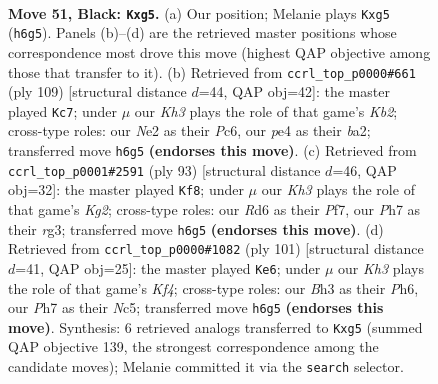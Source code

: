 \documentclass[11pt]{article}
\begin{document}
\clearpage

\begin{figure}[p]\centering
\begin{subfigure}{0.46\textwidth}\centering
\resizebox{\linewidth}{!}{%
\newchessgame
\chessboard[
  setfen={8/7p/3r1p1k/6R1/1p2P1P1/4K2b/4n1r1/8 b - - 6 51},
  showmover=false,
  pgfstyle=straightmove, color=movearrow, markmove={h6-g5}
]}
\caption{}
\end{subfigure}\hfill
\begin{subfigure}{0.46\textwidth}\centering
\resizebox{\linewidth}{!}{%
\newchessgame
\chessboard[
  setfen={8/1k6/2p2r2/4b2P/1R3P2/p4K2/B7/8 b - - 5 55},
  showmover=false,
  pgfstyle=straightmove, color=movearrow, markmove={b7-c7}
]}
\caption{}
\end{subfigure}
\\[4pt]
\begin{subfigure}{0.46\textwidth}\centering
\resizebox{\linewidth}{!}{%
\newchessgame
\chessboard[
  setfen={8/5pk1/8/p4K2/2R2P2/6R1/3b1r1p/8 b - - 1 47},
  showmover=false,
  pgfstyle=straightmove, color=movearrow, markmove={g7-f8}
]}
\caption{}
\end{subfigure}\hfill
\begin{subfigure}{0.46\textwidth}\centering
\resizebox{\linewidth}{!}{%
\newchessgame
\chessboard[
  setfen={8/8/7p/2n1pkrp/R7/5RP1/6K1/8 b - - 5 51},
  showmover=false,
  pgfstyle=straightmove, color=movearrow, markmove={f5-e6}
]}
\caption{}
\end{subfigure}
\caption{\textbf{Move 51, Black: \texttt{Kxg5}.} (a) Our position; Melanie plays \texttt{Kxg5} (\texttt{h6g5}). Panels (b)--(d) are the retrieved master positions whose correspondence most drove this move (highest QAP objective among those that transfer to it). (b) Retrieved from \texttt{ccrl\_top\_p0000\#661} (ply 109) [structural distance $d$=44, QAP obj=42]: the master played \texttt{Kc7}; under $\mu$ our \emph{Kh3} plays the role of that game's \emph{Kb2}; cross-type roles: our \emph{N}e2 as their \emph{P}c6, our \emph{p}e4 as their \emph{b}a2; transferred move \texttt{h6g5} \textbf{(endorses this move)}. (c) Retrieved from \texttt{ccrl\_top\_p0001\#2591} (ply 93) [structural distance $d$=46, QAP obj=32]: the master played \texttt{Kf8}; under $\mu$ our \emph{Kh3} plays the role of that game's \emph{Kg2}; cross-type roles: our \emph{R}d6 as their \emph{P}f7, our \emph{P}h7 as their \emph{r}g3; transferred move \texttt{h6g5} \textbf{(endorses this move)}. (d) Retrieved from \texttt{ccrl\_top\_p0000\#1082} (ply 101) [structural distance $d$=41, QAP obj=25]: the master played \texttt{Ke6}; under $\mu$ our \emph{Kh3} plays the role of that game's \emph{Kf4}; cross-type roles: our \emph{B}h3 as their \emph{P}h6, our \emph{P}h7 as their \emph{N}c5; transferred move \texttt{h6g5} \textbf{(endorses this move)}. Synthesis: 6 retrieved analogs transferred to \texttt{Kxg5} (summed QAP objective 139, the strongest correspondence among the candidate moves); Melanie committed it via the \texttt{search} selector.}
\label{fig:thought-m101}
\end{figure}
\end{document}
